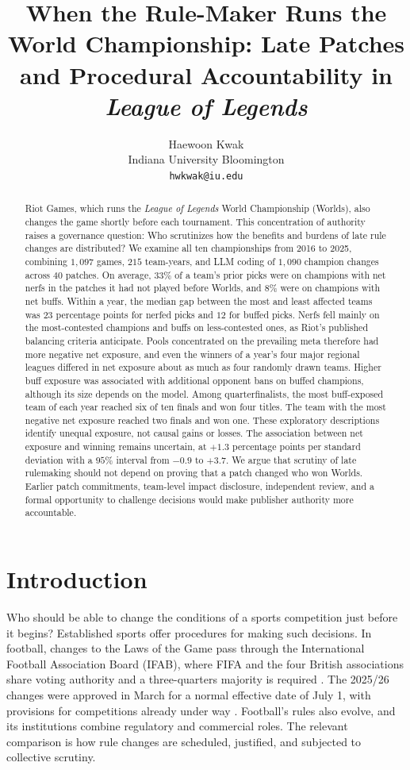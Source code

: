\documentclass[11pt]{article}
\title{When the Rule-Maker Runs the World Championship: Late Patches and Procedural Accountability in \emph{League of Legends}}
\author{Haewoon Kwak\\Indiana University Bloomington\\\texttt{hwkwak@iu.edu}}
\date{}
\begin{document}
\maketitle

\begin{abstract}
Riot Games, which runs the \emph{League of Legends} World Championship (Worlds), also changes the game shortly before each tournament. This concentration of authority raises a governance question: Who scrutinizes how the benefits and burdens of late rule changes are distributed? We examine all ten championships from 2016 to 2025, combining $1{,}097$ games, $215$ team-years, and LLM coding of $1{,}090$ champion changes across $40$ patches. On average, $33\%$ of a team's prior picks were on champions with net nerfs in the patches it had not played before Worlds, and $8\%$ were on champions with net buffs. Within a year, the median gap between the most and least affected teams was $23$ percentage points for nerfed picks and $12$ for buffed picks. Nerfs fell mainly on the most-contested champions and buffs on less-contested ones, as Riot's published balancing criteria anticipate. Pools concentrated on the prevailing meta therefore had more negative net exposure, and even the winners of a year's four major regional leagues differed in net exposure about as much as four randomly drawn teams. Higher buff exposure was associated with additional opponent bans on buffed champions, although its size depends on the model. Among quarterfinalists, the most buff-exposed team of each year reached six of ten finals and won four titles. The team with the most negative net exposure reached two finals and won one. These exploratory descriptions identify unequal exposure, not causal gains or losses. The association between net exposure and winning remains uncertain, at $+1.3$ percentage points per standard deviation with a $95\%$ interval from $-0.9$ to $+3.7$. We argue that scrutiny of late rulemaking should not depend on proving that a patch changed who won Worlds. Earlier patch commitments, team-level impact disclosure, independent review, and a formal opportunity to challenge decisions would make publisher authority more accountable.
\end{abstract}

\section{Introduction}

Who should be able to change the conditions of a sports competition just before it begins? Established sports offer procedures for making such decisions. In football, changes to the Laws of the Game pass through the International Football Association Board (IFAB), where FIFA and the four British associations share voting authority and a three-quarters majority is required \citep{ifaborganisation}. The 2025/26 changes were approved in March for a normal effective date of July 1, with provisions for competitions already under way \citep{ifab2025circular}. Football's rules also evolve, and its institutions combine regulatory and commercial roles. The relevant comparison is how rule changes are scheduled, justified, and subjected to collective scrutiny.
\end{document}
